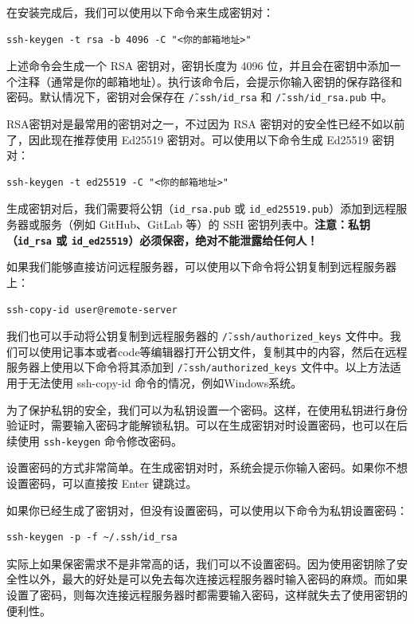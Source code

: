 \documentclass[../main.tex]{subfiles}
\begin{document}
在安装完成后，我们可以使用以下命令来生成密钥对：
\begin{verbatim}
ssh-keygen -t rsa -b 4096 -C "<你的邮箱地址>"
\end{verbatim}

上述命令会生成一个 RSA 密钥对，密钥长度为 4096 位，并且会在密钥中添加一个注释（通常是你的邮箱地址）。执行该命令后，会提示你输入密钥的保存路径和密码。默认情况下，密钥对会保存在 \texttt{\~/.ssh/id\_rsa} 和 \texttt{\~/.ssh/id\_rsa.pub} 中。

RSA密钥对是最常用的密钥对之一，不过因为 RSA 密钥对的安全性已经不如以前了，因此现在推荐使用 Ed25519 密钥对。可以使用以下命令生成 Ed25519 密钥对：
\begin{verbatim}
ssh-keygen -t ed25519 -C "<你的邮箱地址>"
\end{verbatim}

生成密钥对后，我们需要将公钥（\texttt{id\_rsa.pub} 或 \texttt{id\_ed25519.pub}）添加到远程服务器或服务（例如 GitHub、GitLab 等）的 SSH 密钥列表中。\textbf{注意：私钥（\texttt{id\_rsa} 或 \texttt{id\_ed25519}）必须保密，绝对不能泄露给任何人！}

如果我们能够直接访问远程服务器，可以使用以下命令将公钥复制到远程服务器上：
\begin{verbatim}
ssh-copy-id user@remote-server
\end{verbatim}

我们也可以手动将公钥复制到远程服务器的 \texttt{\~/.ssh/authorized\_keys} 文件中。我们可以使用记事本或者code等编辑器打开公钥文件，复制其中的内容，然后在远程服务器上使用以下命令将其添加到 \texttt{\~/.ssh/authorized\_keys} 文件中。以上方法适用于无法使用 ssh-copy-id 命令的情况，例如Windows系统。

为了保护私钥的安全，我们可以为私钥设置一个密码。这样，在使用私钥进行身份验证时，需要输入密码才能解锁私钥。可以在生成密钥对时设置密码，也可以在后续使用 \texttt{ssh-keygen} 命令修改密码。

设置密码的方式非常简单。在生成密钥对时，系统会提示你输入密码。如果你不想设置密码，可以直接按 Enter 键跳过。

如果你已经生成了密钥对，但没有设置密码，可以使用以下命令为私钥设置密码：
\begin{verbatim}
ssh-keygen -p -f ~/.ssh/id_rsa
\end{verbatim}

实际上如果保密需求不是非常高的话，我们可以不设置密码。因为使用密钥除了安全性以外，最大的好处是可以免去每次连接远程服务器时输入密码的麻烦。而如果设置了密码，则每次连接远程服务器时都需要输入密码，这样就失去了使用密钥的便利性。
\end{document}
